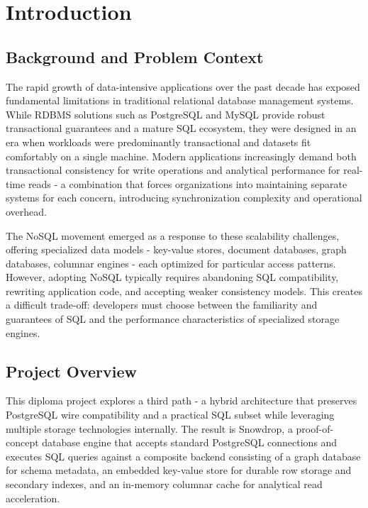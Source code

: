 \chapter{Introduction}
\label{chap:intro}

\section{Background and Problem Context}

The rapid growth of data-intensive applications over the past decade has exposed fundamental limitations in traditional relational database management systems. While RDBMS solutions such as PostgreSQL and MySQL provide robust transactional guarantees and a mature SQL ecosystem, they were designed in an era when workloads were predominantly transactional and datasets fit comfortably on a single machine. Modern applications increasingly demand both transactional consistency for write operations and analytical performance for real-time reads - a combination that forces organizations into maintaining separate systems for each concern, introducing synchronization complexity and operational overhead.

The NoSQL movement emerged as a response to these scalability challenges, offering specialized data models - key-value stores, document databases, graph databases, columnar engines - each optimized for particular access patterns. However, adopting NoSQL typically requires abandoning SQL compatibility, rewriting application code, and accepting weaker consistency models. This creates a difficult trade-off: developers must choose between the familiarity and guarantees of SQL and the performance characteristics of specialized storage engines.

\section{Project Overview}

This diploma project explores a third path - a hybrid architecture that preserves PostgreSQL wire compatibility and a practical SQL subset while leveraging multiple storage technologies internally. The result is Snowdrop, a proof-of-concept database engine that accepts standard PostgreSQL connections and executes SQL queries against a composite backend consisting of a graph database for schema metadata, an embedded key-value store for durable row storage and secondary indexes, and an in-memory columnar cache for analytical read acceleration.


